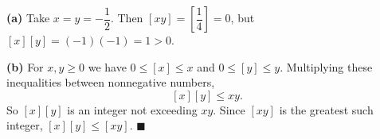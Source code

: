 \textbf{(a)} Take $x=y=-\dfrac12$. Then $[xy]=\left[\dfrac14\right]=0$, but $[x][y]=(-1)(-1)=1>0$.

\textbf{(b)} For $x,y\ge0$ we have $0\le[x]\le x$ and $0\le[y]\le y$. Multiplying these inequalities between nonnegative numbers,
\[[x][y]\le xy.\]
So $[x][y]$ is an integer not exceeding $xy$. Since $[xy]$ is the greatest such integer, $[x][y]\le[xy]$. $\blacksquare$
